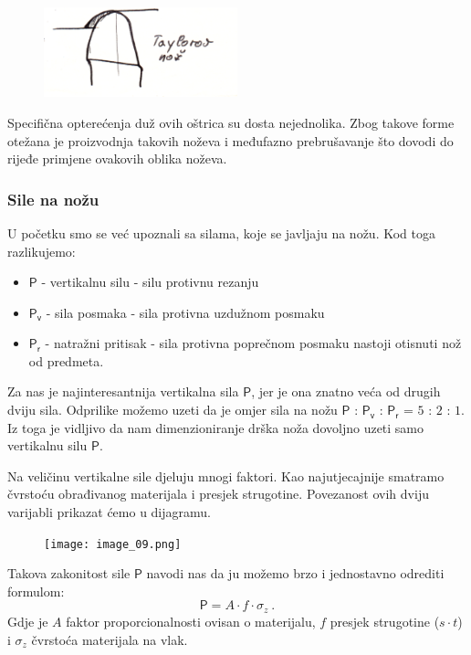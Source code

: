 \documentclass[a4paper,12pt]{article}
\numberwithin{figure}{section}
\begin{document}
\begin{figure}[!h]
\includegraphics[width=0.5\textwidth]{image_08-2.png}
\end{figure}
\FloatBarrier
\noindent Specifična opterećenja duž ovih oštrica su dosta nejednolika. Zbog takove forme otežana je proizvodnja takovih noževa i međufazno prebrušavanje što dovodi do rijeđe primjene ovakovih oblika noževa. 
\subsubsection*{Sile na nožu}
U početku smo se već upoznali sa silama, koje se javljaju na nožu. Kod toga razlikujemo:
\begin{itemize}
\item $\mathsf{P}$ - vertikalnu silu - silu protivnu rezanju
\item $\mathsf{P_{v}}$ - sila posmaka - sila protivna uzdužnom posmaku
\item $\mathsf{P_{r}}$ - natražni pritisak - sila protivna poprečnom posmaku nastoji otisnuti nož od predmeta.
\end{itemize}
\par
Za nas je najinteresantnija vertikalna sila $\mathsf{P}$, jer je ona znatno veća od drugih dviju sila. Odprilike možemo uzeti da je omjer sila na nožu $\mathsf{P}$ : $\mathsf{P_{v}}$ : $\mathsf{P_{r}}$ = $5$ : $2$ : $1$. Iz toga je vidljivo da nam dimenzioniranje drška noža dovoljno uzeti samo vertikalnu silu $\mathsf{P}$. \par
Na veličinu vertikalne sile djeluju mnogi faktori. Kao najutjecajnije smatramo čvrstoću obrađivanog materijala i presjek strugotine. Povezanost ovih dviju varijabli prikazat ćemo u dijagramu.
\begin{figure}[!h]
\texttt{[image: image\_09.png]}
\end{figure}
\FloatBarrier
Takova zakonitost sile $\mathsf{P}$ navodi nas da ju možemo brzo i jednostavno odrediti formulom:
\begin{equation}
\mathsf{P} = A \cdot f \cdot \sigma_{z}\:.
\end{equation}
Gdje je $A$ faktor proporcionalnosti ovisan o materijalu, $f$ presjek strugotine ($s\cdot t$)  i $\sigma_{z}$ čvrstoća materijala na vlak. \par
\end{document}
